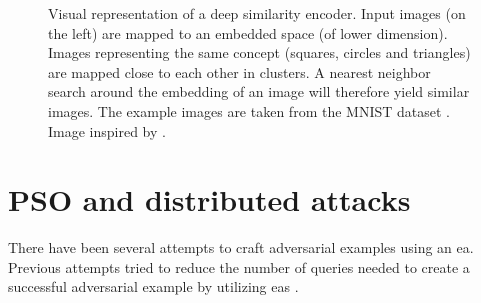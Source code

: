 \begin{figure}
\caption[Deep similarity encoder]{Visual representation of a deep similarity encoder. Input images (on the left) are mapped to an embedded space (of lower dimension). Images representing the same concept (squares, circles and triangles) are mapped close to each other in clusters. A nearest neighbor search around the embedding of an image will therefore yield similar images. The example images are taken from the MNIST dataset \cite{mnist}. Image inspired by \cite{deep_similarity_encoder}.}
\label{fig:deep_similarity_encoder}
\end{figure}

\section{PSO and distributed attacks}\label{sec:pso_and_distributed_attacks}
There have been several attempts to craft adversarial examples using an \gls{ea}. Previous attempts tried to reduce the number of queries needed to create a successful adversarial example by utilizing \glspl{ea} \cite{genattack,dong2019efficient,mosli2019they,audio_pso,distributed_pso_attack,suryanto2020}. \\


